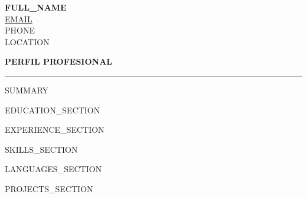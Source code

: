 \documentclass[letterpaper,11pt]{article}
\newcommand{\resumesection}[1]{
    \vspace{0.5em}
    \textbf{\large #1}
    \vspace{0.2em}
    \hrule
    \vspace{0.5em}
}
\begin{document}
\begin{flushleft}
    {\huge \textbf{{{FULL_NAME}}}} \\[0.3em]
    \href{mailto:{{EMAIL}}}{{{EMAIL}}} \\
    {{PHONE}} \\
    {{LOCATION}}
\end{flushleft}

\resumesection{PERFIL PROFESIONAL}

{{SUMMARY}}

{{EDUCATION_SECTION}}

{{EXPERIENCE_SECTION}}

{{SKILLS_SECTION}}

{{LANGUAGES_SECTION}}

{{PROJECTS_SECTION}}
\end{document}
